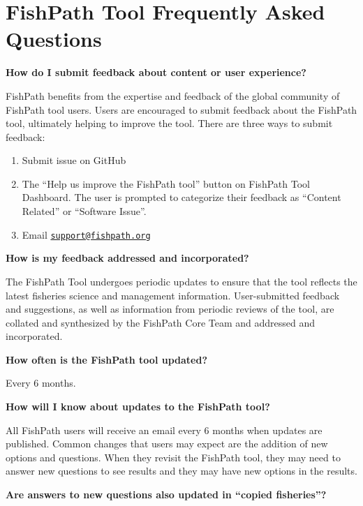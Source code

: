 \documentclass[11pt,]{book}
\providecommand{\tightlist}{%
  \setlength{\itemsep}{0pt}\setlength{\parskip}{0pt}}
\begin{document}
\hypertarget{appendix-appendix}{%
\appendix}


\hypertarget{fishpath-tool-frequently-asked-questions}{%
\chapter{FishPath Tool Frequently Asked Questions}\label{fishpath-tool-frequently-asked-questions}}

\textbf{How do I submit feedback about content or user experience?}

FishPath benefits from the expertise and feedback of the global community of FishPath tool users. Users are encouraged to submit feedback about the FishPath tool, ultimately helping to improve the tool. There are three ways to submit feedback:

\begin{enumerate}
\def\labelenumi{\arabic{enumi}.}
\tightlist
\item
  Submit issue on GitHub\\
\item
  The ``Help us improve the FishPath tool'' button on FishPath Tool Dashboard. The user is prompted to categorize their feedback as ``Content Related'' or ``Software Issue''.
\item
  Email \href{mailto:support@fishpath.org}{\nolinkurl{support@fishpath.org}}
\end{enumerate}

\textbf{How is my feedback addressed and incorporated?}

The FishPath Tool undergoes periodic updates to ensure that the tool reflects the latest fisheries science and management information. User-submitted feedback and suggestions, as well as information from periodic reviews of the tool, are collated and synthesized by the FishPath Core Team and addressed and incorporated.

\textbf{How often is the FishPath tool updated?}

Every 6 months.

\textbf{How will I know about updates to the FishPath tool?}

All FishPath users will receive an email every 6 months when updates are published. Common changes that users may expect are the addition of new options and questions. When they revisit the FishPath tool, they may need to answer new questions to see results and they may have new options in the results.

\textbf{Are answers to new questions also updated in ``copied fisheries''?}
\end{document}

